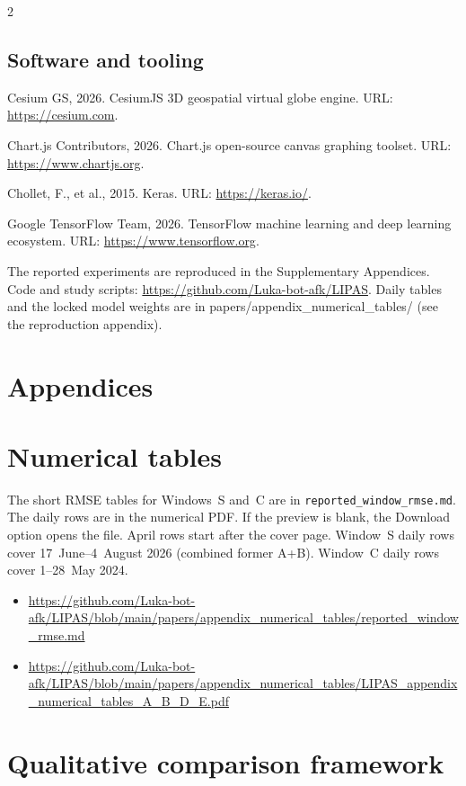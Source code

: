 \begin{multicols}{2}
\subsection*{Software and tooling}
Cesium GS, 2026. CesiumJS 3D geospatial virtual globe engine. URL: \url{https://cesium.com}.

Chart.js Contributors, 2026. Chart.js open-source canvas graphing toolset. URL: \url{https://www.chartjs.org}.

Chollet, F., et al., 2015. Keras. URL: \url{https://keras.io/}.

Google TensorFlow Team, 2026. TensorFlow machine learning and deep learning ecosystem. URL: \url{https://www.tensorflow.org}.

The reported experiments are reproduced in the Supplementary Appendices. Code and study scripts: \url{https://github.com/Luka-bot-afk/LIPAS}. Daily tables and the locked model weights are in papers/appendix\_numerical\_tables/ (see the reproduction appendix).
\end{multicols}
\appendix
\onecolumn
\section*{Appendices}
\section{Numerical tables}

The short RMSE tables for Windows~S and~C are in \texttt{reported\_window\_rmse.md}. The daily rows are in the numerical PDF. If the preview is blank, the Download option opens the file. April rows start after the cover page. Window~S daily rows cover 17~June--4~August 2026 (combined former A+B). Window~C daily rows cover 1--28~May 2024.

\begin{itemize}
\item \url{https://github.com/Luka-bot-afk/LIPAS/blob/main/papers/appendix_numerical_tables/reported_window_rmse.md}
\item \url{https://github.com/Luka-bot-afk/LIPAS/blob/main/papers/appendix_numerical_tables/LIPAS_appendix_numerical_tables_A_B_D_E.pdf}
\end{itemize}

\section{Qualitative comparison framework}

